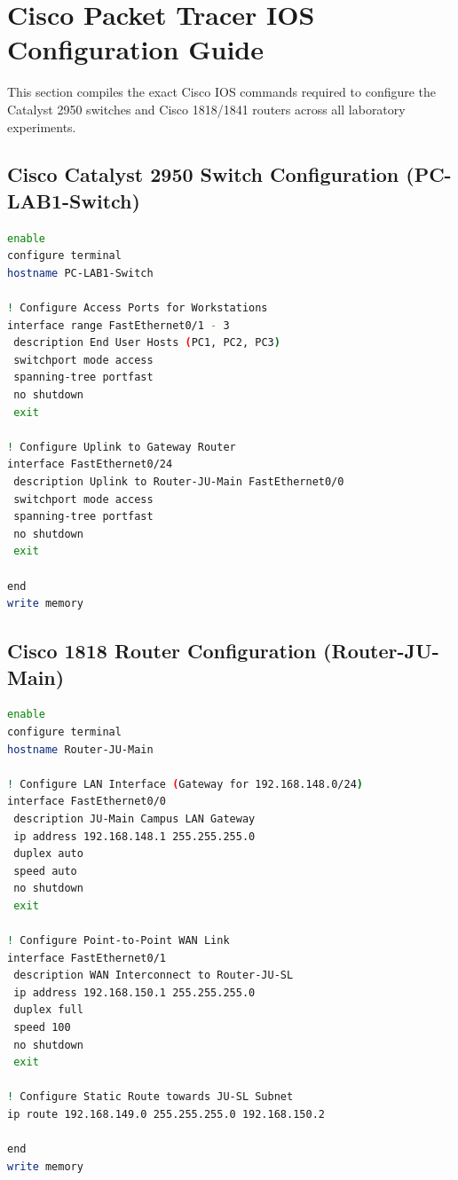 \documentclass[12pt, a4paper]{article}
\begin{document}
\section{Cisco Packet Tracer IOS Configuration Guide}

This section compiles the exact Cisco IOS commands required to configure the Catalyst 2950 switches and Cisco 1818/1841 routers across all laboratory experiments.

\subsection{Cisco Catalyst 2950 Switch Configuration (PC-LAB1-Switch)}
\begin{lstlisting}[language=bash, caption={Cisco IOS Configuration: PC-LAB1-Switch}]
enable
configure terminal
hostname PC-LAB1-Switch

! Configure Access Ports for Workstations
interface range FastEthernet0/1 - 3
 description End User Hosts (PC1, PC2, PC3)
 switchport mode access
 spanning-tree portfast
 no shutdown
 exit

! Configure Uplink to Gateway Router
interface FastEthernet0/24
 description Uplink to Router-JU-Main FastEthernet0/0
 switchport mode access
 spanning-tree portfast
 no shutdown
 exit

end
write memory
\end{lstlisting}

\subsection{Cisco 1818 Router Configuration (Router-JU-Main)}
\begin{lstlisting}[language=bash, caption={Cisco IOS Configuration: Router-JU-Main}]
enable
configure terminal
hostname Router-JU-Main

! Configure LAN Interface (Gateway for 192.168.148.0/24)
interface FastEthernet0/0
 description JU-Main Campus LAN Gateway
 ip address 192.168.148.1 255.255.255.0
 duplex auto
 speed auto
 no shutdown
 exit

! Configure Point-to-Point WAN Link
interface FastEthernet0/1
 description WAN Interconnect to Router-JU-SL
 ip address 192.168.150.1 255.255.255.0
 duplex full
 speed 100
 no shutdown
 exit

! Configure Static Route towards JU-SL Subnet
ip route 192.168.149.0 255.255.255.0 192.168.150.2

end
write memory
\end{lstlisting}
\end{document}
